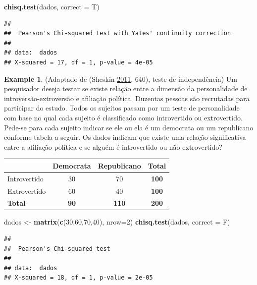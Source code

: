 \documentclass[
]{book}
\newenvironment{Shaded}{\begin{snugshade}}{\end{snugshade}}
\newcommand{\DataTypeTok}[1]{\textcolor[rgb]{0.13,0.29,0.53}{#1}}
\newcommand{\DecValTok}[1]{\textcolor[rgb]{0.00,0.00,0.81}{#1}}
\newcommand{\KeywordTok}[1]{\textcolor[rgb]{0.13,0.29,0.53}{\textbf{#1}}}
\newcommand{\NormalTok}[1]{#1}
\newcommand{\StringTok}[1]{\textcolor[rgb]{0.31,0.60,0.02}{#1}}
\theoremstyle{definition}
\theoremstyle{definition}
\newtheorem{example}{Example}[chapter]
\theoremstyle{definition}
\theoremstyle{remark}
\begin{document}
\begin{Shaded}
\begin{Highlighting}[]
\KeywordTok{chisq.test}\NormalTok{(dados, }\DataTypeTok{correct =}\NormalTok{ T)}
\end{Highlighting}
\end{Shaded}

\begin{verbatim}
## 
##  Pearson's Chi-squared test with Yates' continuity correction
## 
## data:  dados
## X-squared = 17, df = 1, p-value = 4e-05
\end{verbatim}

\begin{example}
\protect\hypertarget{exm:intro-extro-politic}{}{\label{exm:intro-extro-politic} }(Adaptado de (Sheskin \protect\hyperlink{ref-sheskin2011handbook}{2011}, 640), teste de independência) Um pesquisador deseja testar se existe relação entre a dimensão da personalidade de introversão-extroversão e afiliação política. Duzentas pessoas são recrutadas para participar do estudo. Todos os sujeitos passam por um teste de personalidade com base no qual cada sujeito é classificado como introvertido ou extrovertido. Pede-se para cada sujeito indicar se ele ou ela é um democrata ou um republicano conforme tabela a seguir. Os dados indicam que existe uma relação significativa entre a afiliação política e se alguém é introvertido ou não extrovertido?

\begin{longtable}[]{@{}lccc@{}}
\toprule
& Democrata & Republicano & Total\tabularnewline
\midrule
\endhead
Introvertido & 30 & 70 & \textbf{100}\tabularnewline
Extrovertido & 60 & 40 & \textbf{100}\tabularnewline
\textbf{Total} & \textbf{90} & \textbf{110} & \textbf{200}\tabularnewline
\bottomrule
\end{longtable}
\end{example}

\begin{Shaded}
\begin{Highlighting}[]
\NormalTok{dados \textless{}{-}}\StringTok{ }\KeywordTok{matrix}\NormalTok{(}\KeywordTok{c}\NormalTok{(}\DecValTok{30}\NormalTok{,}\DecValTok{60}\NormalTok{,}\DecValTok{70}\NormalTok{,}\DecValTok{40}\NormalTok{), }\DataTypeTok{nrow=}\DecValTok{2}\NormalTok{)}
\KeywordTok{chisq.test}\NormalTok{(dados, }\DataTypeTok{correct =}\NormalTok{ F)}
\end{Highlighting}
\end{Shaded}

\begin{verbatim}
## 
##  Pearson's Chi-squared test
## 
## data:  dados
## X-squared = 18, df = 1, p-value = 2e-05
\end{verbatim}
\end{document}

